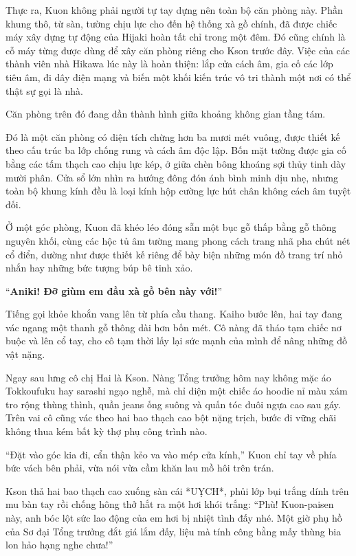 ﻿\documentclass[../main.tex]{subfiles}
\begin{document}
Thực ra, Kuon không phải người tự tay dựng nên toàn bộ căn phòng này. Phần khung thô, từ sàn, tường chịu lực cho đến hệ thống xà gồ chính, đã được chiếc máy xây dựng tự động của Hijaki hoàn tất chỉ trong một đêm. Đó cũng chính là cỗ máy từng được dùng để xây căn phòng riêng cho Kson trước đây. Việc của các thành viên nhà Hikawa lúc này là hoàn thiện: lắp cửa cách âm, gia cố các lớp tiêu âm, đi dây điện mạng và biến một khối kiến trúc vô tri thành một nơi có thể thật sự gọi là nhà.

Căn phòng trên đó đang dần thành hình giữa khoảng không gian tầng tám.

Đó là một căn phòng có diện tích chừng hơn ba mươi mét vuông, được thiết kế theo cấu trúc ba lớp chống rung và cách âm độc lập. Bốn mặt tường được gia cố bằng các tấm thạch cao chịu lực kép, ở giữa chèn bông khoáng sợi thủy tinh dày mười phân. Cửa sổ lớn nhìn ra hướng đông đón ánh bình minh dịu nhẹ, nhưng toàn bộ khung kính đều là loại kính hộp cường lực hút chân không cách âm tuyệt đối.

Ở một góc phòng, Kuon đã khéo léo đóng sẵn một bục gỗ thấp bằng gỗ thông nguyên khối, cùng các hộc tủ âm tường mang phong cách trang nhã pha chút nét cổ điển, dường như được thiết kế riêng để bày biện những món đồ trang trí nhỏ nhắn hay những bức tượng búp bê tinh xảo.

``\textbf{Aniki! Đỡ giùm em đầu xà gồ bên này với!}''

Tiếng gọi khỏe khoắn vang lên từ phía cầu thang. Kaiho bước lên, hai tay đang vác ngang một thanh gỗ thông dài hơn bốn mét. Cô nàng đã tháo tạm chiếc nơ buộc và lên cổ tay, cho cô tạm thời lấy lại sức mạnh của mình để nâng những đồ vật nặng.

Ngay sau lưng cô chị Hai là Kson. Nàng Tổng trưởng hôm nay không mặc áo Tokkoufuku hay sarashi ngạo nghễ, mà chỉ diện một chiếc áo hoodie nỉ màu xám tro rộng thùng thình, quần jeans ống suông và quấn tóc đuôi ngựa cao sau gáy. Trên vai cô cũng vác theo hai bao thạch cao bột nặng trịch, bước đi vững chãi không thua kém bất kỳ thợ phụ công trình nào.

``Đặt vào góc kia đi, cẩn thận kẻo va vào mép cửa kính,'' Kuon chỉ tay về phía bức vách bên phải, vừa nói vừa cầm khăn lau mồ hôi trên trán.

Kson thả hai bao thạch cao xuống sàn cái *UỴCH*, phủi lớp bụi trắng dính trên mu bàn tay rồi chống hông thở hắt ra một hơi khói trắng: ``Phù! Kuon-paisen này, anh bóc lột sức lao động của em hơi bị nhiệt tình đấy nhé. Một giờ phụ hồ của Sơ đại Tổng trưởng đắt giá lắm đấy, liệu mà tính công bằng mấy thùng bia lon hảo hạng nghe chưa!''
\end{document}
